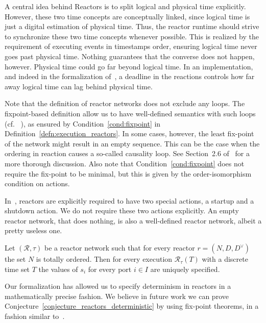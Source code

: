 A central idea behind Reactors is to split logical and physical time explicitly.
However, these two time concepts are conceptually linked, since logical time is just a digital estimation of physical time.
Thus, the reactor runtime should strive to synchronize these two time concepts whenever possible.
This is realized by the requirement of executing events in timestamps order, ensuring logical time never goes past physical time.
Nothing guarantees that the converse does not happen, however.
Physical time could go far beyond logical time.
In an implementation, and indeed in the formalization of~\cite{lohstroh_phdthesis}, a deadline in the reactions controls how far away logical time can lag behind physical time. 

Note that the definition of reactor networks does not exclude any loops.
The fixpoint-based definition allow us to have well-defined semantics with such loops (cf. ~\cite{kahn74,lee_matsikoudis_semantics}),
as ensured by Condition~\ref{cond:fixpoint} in Definition~\ref{defn:execution_reactors}.
In some cases, however, the least fix-point of the network might result in an empty sequence.
This can be the case when the ordering in reaction causes a so-called causality loop.
See Section~2.6 of~\cite{lohstroh_phdthesis} for a more thorough discussion.
Also note that Condition~\ref{cond:fixpoint} does not require the fix-point to be minimal, but this is given by the order-isomorphism condition on actions.

In~\cite{lohstroh_phdthesis}, reactors are explicitly required to have two special actions, a startup and a shutdown action.
We do not require these two actions explicitly.
An empty reactor network, that does nothing, is also a well-defined reactor network, albeit a pretty useless one.

\begin{conjecture}
    \label{conjecture_reactors_deterministic}
Let $(\mathcal{R},\tau)$ be a reactor network such that for every reactor $r = (N,D,D^\vee)$ the set $N$ is totally ordered.
Then for every execution $\mathcal{R}_\tau(T)$ with a discrete time set $T$ the values of $s_i$ for every port $i \in I$ are uniquely specified.
\end{conjecture}

Our formalization has allowed us to specify determinism in reactors in a mathematically precise fashion.
We believe in future work we can prove Conjecture~\ref{conjecture_reactors_deterministic} by using fix-point theorems, in a fashion similar to~\cite{kahn74}.

